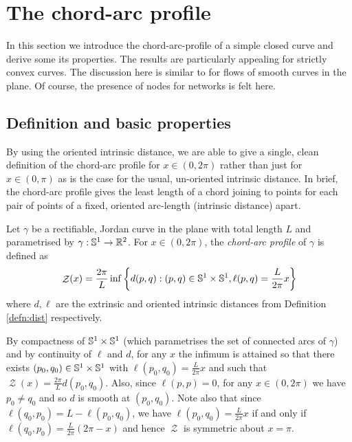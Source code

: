 \documentclass[11pt]{amsart}
\DeclareMathOperator{\chordarcprofile}{\mathcal{Z}}
\begin{document}
\section{The chord-arc profile}
\label{sec:orgheadline10}

In this section we introduce the chord-arc-profile of a simple closed curve and derive some its properties. The results are particularly appealing for strictly convex curves. The discussion here is similar to \cite{alpha_csf_dist_comp} for flows of smooth curves in the plane. Of course, the presence of nodes for networks is felt here.

\subsection{Definition and basic properties}
\label{sec:orgheadline7}

By using the oriented intrinsic distance, we are able to give a single, clean definition of the chord-arc profile for \(x \in (0, 2\pi)\) rather than just for \(x \in (0, \pi)\) as is the case for the usual, un-oriented intrinsic distance. In brief, the chord-arc profile gives the least length of a chord joining to points for each pair of points of a fixed, oriented arc-length (intrinsic distance) apart.

\begin{defn}
Let \(\gamma\) be a rectifiable, Jordan curve in the plane with total length \(L\) and parametrised by \(\gamma: \mathbb{S}^1 \to \mathbb{R}^2\). For \(x\in (0, 2\pi)\), the \emph{chord-arc profile} of \(\gamma\) is defined as
\[
\chordarcprofile (x) = \frac{2\pi}{L} \inf\left\{d(p, q): (p,q) \in \sphere^1\times\sphere^1, \ell(p,q) = \frac{L}{2\pi} x\right\}
\]
where \(d, \ell\) are the extrinsic and oriented intrinsic distances from Definition \ref{defn:dist} respectively.
\end{defn}

\begin{remark}
By compactness of \(\mathbb{S}^1\times \mathbb{S}^1\) (which parametrises the set of connected arcs of \(\gamma\)) and by continuity of \(\ell\) and \(d\), for any \(x\) the infimum is attained so that there exists \((p_0,q_0) \in \mathbb{S}^1 \times \mathbb{S}^1\) with \(\ell(p_0, q_0) = \frac{L}{2\pi}x\) and such that \(\chordarcprofile(x) = \frac{2\pi}{L} d(p_0, q_0)\). Also, since \(\ell(p,p) = 0\), for any \(x\in(0,2\pi)\) we have \(p_0 \ne q_0\) and so \(d\) is smooth at \((p_0, q_0)\). Note also that since \(\ell(q_0, p_0) = L - \ell(p_0, q_0)\), we have \(\ell(p_0, q_0) = \tfrac{L}{2\pi}x\) if and only if \(\ell(q_0, p_0) = \frac{L}{2\pi}(2\pi - x)\) and hence \(\chordarcprofile\) is symmetric about \(x = \pi\).
\end{remark}
\end{document}
